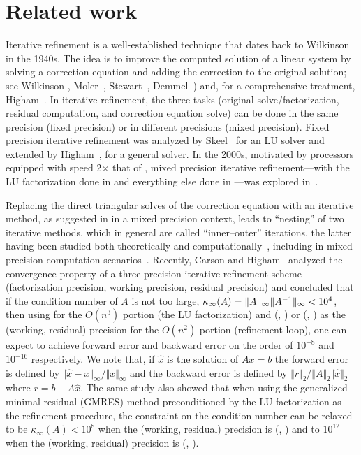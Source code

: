 \section{Related work}\label{sec:related}

Iterative refinement is a well-established technique that dates back to
Wilkinson in the 1940s. The idea is to improve the computed solution of a
linear system by solving a correction equation and adding the
correction to the original solution; see Wilkinson \cite{Wilkinson_1963},
Moler~\cite{Moler_1967_jacm}, Stewart~\cite{Stewart_1973},
Demmel~\cite{Demmel_1997})
and, for a comprehensive treatment, Higham~\cite[Chap.~12]{Higham_2002}.
In iterative refinement, the three tasks (original solve/factorization,
residual computation, and correction equation solve) can be done in the
same precision (fixed precision) or in different precisions (mixed
precision). Fixed precision iterative refinement was analyzed by
Skeel~\cite{Skeel80} for an LU solver and extended by
Higham~\cite{Higham1991}, \cite{high97i} for a general solver. In the 2000s, motivated by
processors equipped with \fsp speed 2$\times$ that of \fdp, mixed precision
iterative refinement---with the LU factorization done in \fsp and
everything else done in \fdp---was explored
in~\cite{Langou_2006_sc,Buttari_2007_sc}.

Replacing the direct triangular solves of the correction equation with an
iterative method,
as suggested in \cite{carson2017new} in a mixed precision context,
leads to ``nesting'' of two iterative methods, which in general
are called ``inner--outer'' iterations, the latter having been studied both
theoretically and
computationally~\cite{golub00inexact,saad91flexible,flexible-inner-outer},
including in mixed-precision computation
scenarios~\cite{BaboulinBDKLLLT09}.
Recently, Carson and Higham~\cite{carson2017accelerating,carson2017new}
analyzed the convergence property of a three precision iterative refinement scheme
(factorization precision, working precision, residual precision) and concluded that
if the condition number of $A$ is not too large,
$\kappa_\infty(A) = \|A\|_{\infty}\|A^{-1}\|_{\infty}<10^4$,
then using
\fhp for the $O(n^3)$ portion (the LU factorization)
and (\fsp, \fdp) or (\fdp, \fqp)
as the (working, residual) precision for
the $O(n^2)$ portion (refinement loop),
one can expect to achieve
forward error and
backward error  on the order of $10^{-8}$ and $10^{-16}$ respectively.
%                                                     
We note that, if $\hat{x}$ is the solution of $Ax=b$
the forward error is defined by $\Vert \hat{x} - x \Vert_\infty/\Vert x \Vert_\infty$
and the backward error is defined by 
$\Vert r \Vert_{2} / \Vert A \Vert_{2} \Vert \hat{x} \Vert_{2}$ where $r=b-A\hat{x}$.
%                                                           
The same study also showed that when using the generalized minimal residual
(GMRES) method preconditioned by the \fhp LU factorization
as the refinement procedure, the
constraint on the condition number can be relaxed to be
$\kappa_\infty(A)<10^8$ when the (working, residual) precision is (\fsp, \fdp)
and to $10^{12}$ when the (working, residual) precision is (\fdp, \fqp).


